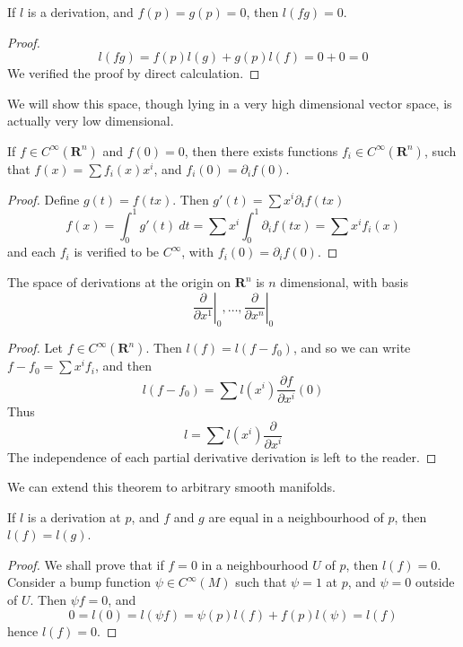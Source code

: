 \begin{lemma}
    If $l$ is a derivation, and $f(p) = g(p) = 0$, then $l(fg) = 0$.
\end{lemma}
\begin{proof}
    \[ l(fg) = f(p) l(g) + g(p) l(f) = 0 + 0 = 0 \]
    We verified the proof by direct calculation.
\end{proof}

We will show this space, though lying in a very high dimensional vector space, is actually very low dimensional.

\begin{lemma}
    If $f \in C^\infty(\mathbf{R}^n)$ and $f(0) = 0$, then there exists functions $f_i \in C^\infty(\mathbf{R}^n)$, such that $f(x) = \sum f_i(x) x^i$, and $f_i(0) = \partial_i f(0)$.
\end{lemma}
\begin{proof}
    Define $g(t) = f(tx)$. Then $g'(t) = \sum x^i \partial_i f(tx)$
    \[ f(x) = \int_0^1 g'(t)\ dt = \sum x^i \int_0^1 \partial_i f(tx) = \sum x^i f_i(x) \]
    and each $f_i$ is verified to be $C^\infty$, with $f_i(0) = \partial_i f(0)$.
\end{proof}

\begin{theorem}
    The space of derivations at the origin on $\mathbf{R}^n$ is $n$ dimensional, with basis
    \[ \left.\frac{\partial}{\partial x^1}\right|_0, \dots, \left.\frac{\partial}{\partial x^n}\right|_0 \]
\end{theorem}
\begin{proof}
    Let $f \in C^\infty(\mathbf{R}^n)$. Then $l(f) = l(f - f_0)$, and so we can write $f - f_0 = \sum x^i f_i$, and then
    \[ l(f - f_0) = \sum l(x^i) \frac{\partial f}{\partial x^i}(0) \]
    Thus
    \[ l = \sum l(x^i) \frac{\partial}{\partial x^i} \]
    The independence of each partial derivative derivation is left to the reader.
\end{proof}

We can extend this theorem to arbitrary smooth manifolds.

\begin{lemma}
    If $l$ is a derivation at $p$, and $f$ and $g$ are equal in a neighbourhood of $p$, then $l(f) = l(g)$.
\end{lemma}
\begin{proof}
    We shall prove that if $f = 0$ in a neighbourhood $U$ of $p$, then $l(f) = 0$. Consider a bump function $\psi \in C^\infty(M)$ such that $\psi = 1$ at $p$, and $\psi = 0$ outside of $U$. Then $\psi f = 0$, and
    \[ 0 = l(0) = l(\psi f) = \psi(p) l(f) + f(p) l(\psi) = l(f) \]
    hence $l(f) = 0$.
\end{proof}


